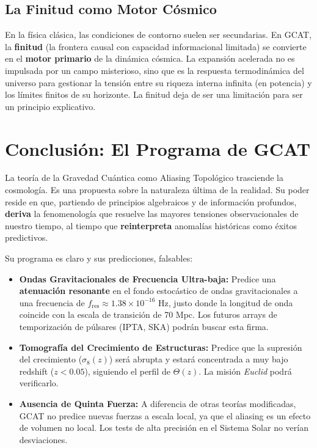 \documentclass[12pt, a4paper]{article}
\begin{document}
\subsection{La Finitud como Motor Cósmico}

En la física clásica, las condiciones de contorno suelen ser secundarias. En GCAT, la \textbf{finitud} (la frontera causal con capacidad informacional limitada) se convierte en el \textbf{motor primario} de la dinámica cósmica. La expansión acelerada no es impulsada por un campo misterioso, sino que es la respuesta termodinámica del universo para gestionar la tensión entre su riqueza interna infinita (en potencia) y los límites finitos de su horizonte. La finitud deja de ser una limitación para ser un principio explicativo.

\section{Conclusión: El Programa de GCAT}

La teoría de la Gravedad Cuántica como Aliasing Topológico trasciende la cosmología. Es una propuesta sobre la naturaleza última de la realidad. Su poder reside en que, partiendo de principios algebraicos y de información profundos, \textbf{deriva} la fenomenología que resuelve las mayores tensiones observacionales de nuestro tiempo, al tiempo que \textbf{reinterpreta} anomalías históricas como éxitos predictivos.

Su programa es claro y sus predicciones, falsables:

\begin{itemize}
    \item \textbf{Ondas Gravitacionales de Frecuencia Ultra-baja:} Predice una \textbf{atenuación resonante} en el fondo estocástico de ondas gravitacionales a una frecuencia de $f_{\text{res}} \approx 1.38 \times 10^{-16}$ Hz, justo donde la longitud de onda coincide con la escala de transición de 70 Mpc. Los futuros arrays de temporización de púlsares (IPTA, SKA) podrán buscar esta firma.
    \item \textbf{Tomografía del Crecimiento de Estructuras:} Predice que la supresión del crecimiento ($\sigma_8(z)$) será abrupta y estará concentrada a muy bajo redshift ($z < 0.05$), siguiendo el perfil de $\Theta(z)$. La misión \textit{Euclid} podrá verificarlo.
    \item \textbf{Ausencia de Quinta Fuerza:} A diferencia de otras teorías modificadas, GCAT no predice nuevas fuerzas a escala local, ya que el aliasing es un efecto de volumen no local. Los tests de alta precisión en el Sistema Solar no verían desviaciones.
\end{itemize}
\end{document}
